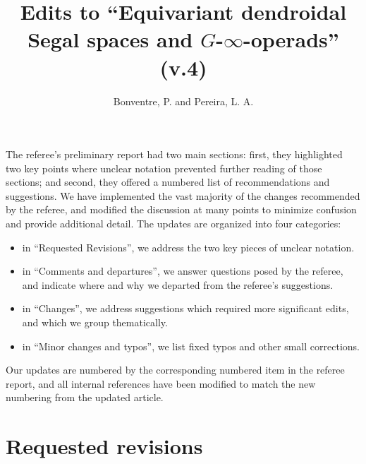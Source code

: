 \documentclass{article}
\begin{document}
 
 
\title{Edits to ``Equivariant dendroidal Segal spaces and $G$-$\infty$-operads'' (v.4)
\\[12pt]} %
 
\author{Bonventre, P. and Pereira, L. A.}
 
\maketitle
 
The referee's preliminary report had two main sections:
first, they highlighted two key points where unclear notation prevented further reading of those sections; %
and second, they offered a numbered list of recommendations and suggestions.
We have implemented the vast majority of the changes recommended by the referee, and modified the discussion at many points to minimize confusion and provide additional detail.
The updates are organized into four categories:
\begin{itemize}
\item in ``Requested Revisions'', we address the two key pieces of unclear notation.
\item in ``Comments and departures'', we answer questions posed by the referee, and indicate where and why we departed from the referee's suggestions.
\item in ``Changes'', we address suggestions which required more significant edits,
and which we group thematically.
\item in ``Minor changes and typos'', we list fixed typos and other small corrections. %
\end{itemize}

Our updates are numbered by the corresponding numbered item in the referee report,
and all internal references have been modified to match the new numbering from the updated article.



\section{Requested revisions}

\end{document}
